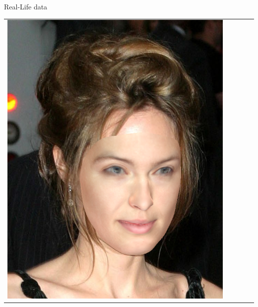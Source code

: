 \documentclass{beamer}
\begin{document}
\begin{frame}[c]{Real-Life data}
\begin{table}[h!]
\begin{tabular}{ | m{1.8cm} | m{1.8cm} | m{1.8cm}| m{1.8cm} | m{1.8cm} |}
\begin{minipage}{1.8cm}
				\includegraphics[width=\linewidth]{realLife/test0_overlay_EGGER.png}
				\vspace{1pt}
			\end{minipage}
			& 
			\begin{minipage}{1.8cm}
				\centering
				\vspace{1pt}

\end{minipage}
\end{tabular}
\end{table}
\end{frame}
\end{document}
